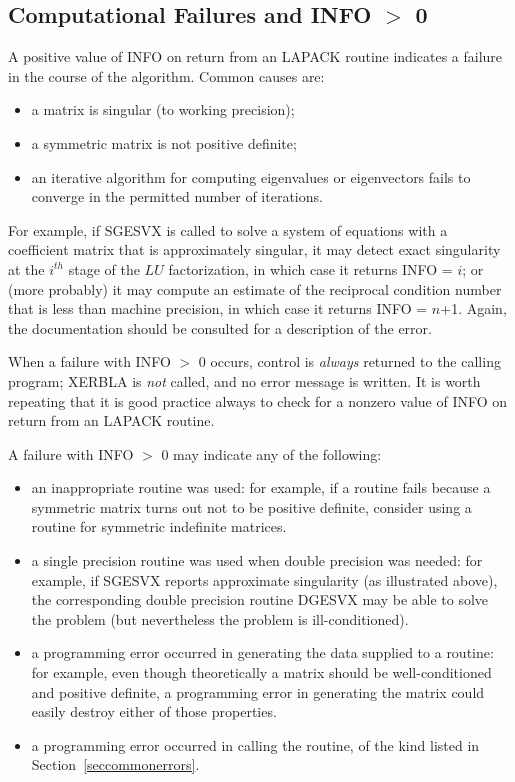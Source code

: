 \subsection{Computational Failures and INFO $>$ 0}
A positive value of INFO on return from an LAPACK routine indicates a
failure in the course of the algorithm. Common causes are:
\begin{itemize}
\item a matrix is singular (to working precision);
\item a symmetric matrix is not positive definite;
\item an iterative algorithm for computing eigenvalues or eigenvectors
fails to converge in the permitted number of iterations.
\end{itemize}
For example, if SGESVX is called to solve a system of equations 
with a coefficient matrix that is approximately singular,
it may detect exact singularity at the $i^{th}$ stage of the $LU$
factorization, in which case it returns INFO = $i$;
or (more probably) it may compute an estimate of the reciprocal condition number
that is less than machine precision, in which case it returns INFO = $n$+1.
Again, the documentation should be consulted for a 
description of the error.  

When a failure with INFO $>$ 0 occurs, control is {\em always} returned
to the calling program; XERBLA is {\em not} called, and no error message
is written. 
It is worth repeating that it is good practice always to check for
a nonzero value of INFO on return from an LAPACK routine.

A failure with INFO $>$ 0 may indicate any of the following:

\begin{itemize}

\item an inappropriate routine was used: 
for example, if a routine fails because a symmetric matrix turns out not to be 
positive definite, consider using a routine for symmetric indefinite matrices.

\item a single precision routine was used when double precision was needed:
for example, if SGESVX reports approximate singularity
(as illustrated above), the corresponding double precision routine DGESVX
may be able to solve the problem (but nevertheless the problem is
ill-conditioned).

\item a programming error occurred in generating the data supplied
to a routine: for example, even though theoretically a matrix should be
well-conditioned and positive definite, a programming error in generating
the matrix could easily destroy either of those properties.

\item a programming error occurred in calling the routine, of the kind 
listed in Section~\ref{seccommonerrors}.

\end{itemize}

